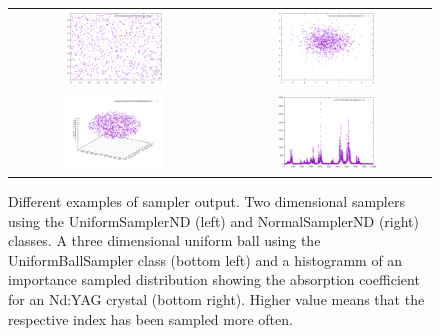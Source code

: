 \documentclass[a4paper,10pt]{article}
\begin{document}
    \begin{figure}
        \begin{tabular}{c c}
            \includegraphics[width=0.5\textwidth]{images/sampling_uniform.pdf} &
            \includegraphics[width=0.5\textwidth]{images/sampling_normal.pdf} \\
            \includegraphics[width=0.5\textwidth]{images/sampling_uniform_ball.pdf} &
            \includegraphics[width=0.5\textwidth]{images/sampling_importance.pdf}
        \end{tabular}
        \caption{
        Different examples of sampler output.
        Two dimensional samplers using the UniformSamplerND (left) and 
        NormalSamplerND (right) classes.
        A three dimensional uniform ball using the UniformBallSampler class
        (bottom left) and a histogramm of an importance sampled distribution
        showing the absorption coefficient for an Nd:YAG crystal (bottom right).
        Higher value means that the respective index has been sampled more often.
        }
        \label{fig:sampler_example}
    \end{figure}
      
\end{document}
